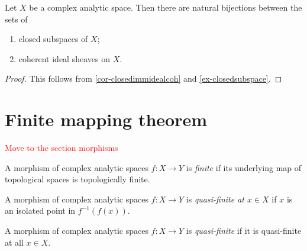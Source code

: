 \begin{corollary}
    Let $X$ be a complex analytic space. Then there are natural bijections between the sets of
    \begin{enumerate}
        \item closed subspaces of $X$;
        \item coherent ideal sheaves on $X$.
    \end{enumerate}
\end{corollary}
\begin{proof}
    This follows from \cref{cor-closedimmidealcoh} and \cref{ex-closedsubspace}.
\end{proof}

\section{Finite mapping theorem}

\textcolor{red}{Move to the section morphisms}

\begin{definition}
    A morphism of complex analytic spaces $f:X\rightarrow Y$ is \emph{finite} if its underlying map of topological spaces is topologically finite.
\end{definition}
\begin{definition}
    A morphism of complex analytic spaces $f:X\rightarrow Y$ is \emph{quasi-finite at $x\in X$} if $x$ is an isolated point in $f^{-1}(f(x))$.

    A morphism of complex analytic spaces $f:X\rightarrow Y$ is \emph{quasi-finite} if it is quasi-finite at all $x\in X$.
\end{definition}


